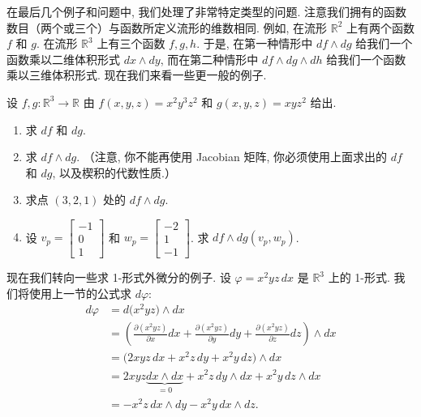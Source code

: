 在最后几个例子和问题中, 我们处理了非常特定类型的问题. 注意我们拥有的函数数目（两个或三个）与函数所定义流形的维数相同. 例如, 在流形 $\mathbb{R}^2$ 上有两个函数 $f$ 和 $g$. 在流形 $\mathbb{R}^3$ 上有三个函数 $f,g,h$. 于是, 在第一种情形中 $df\wedge dg$ 给我们一个函数乘以二维体积形式 $dx\wedge dy$, 而在第二种情形中 $df\wedge dg\wedge dh$ 给我们一个函数乘以三维体积形式. 现在我们来看一些更一般的例子.

\begin{question}\label{q:4-13}
设 $f,g:\mathbb{R}^3\to\mathbb{R}$ 由 $f(x,y,z)=x^2y^3z^2$ 和 $g(x,y,z)=xyz^2$ 给出.
\begin{enumerate}
  \item[(a)] 求 $df$ 和 $dg$.
  \item[(b)] 求 $df\wedge dg$. （注意, 你不能再使用 Jacobian 矩阵, 你必须使用上面求出的 $df$ 和 $dg$, 以及楔积的代数性质.）
  \item[(c)] 求点 $(3,2,1)$ 处的 $df\wedge dg$.
  \item[(d)] 设 $v_p=\begin{bmatrix}-1\\0\\1\end{bmatrix}$ 和 $w_p=\begin{bmatrix}-2\\1\\-1\end{bmatrix}$. 求 $df\wedge dg(v_p,w_p)$.
\end{enumerate}
\end{question}

现在我们转向一些求 1-形式外微分的例子. 设 $\varphi=x^2yz\,dx$ 是 $\mathbb{R}^3$ 上的 1-形式. 我们将使用上一节的公式求 $d\varphi$: 
\begin{align*}
d\varphi&=d\bigl(x^2yz\bigr)\wedge dx\\
&=\left(\frac{\partial(x^2yz)}{\partial x}dx+\frac{\partial(x^2yz)}{\partial y}dy+\frac{\partial(x^2yz)}{\partial z}dz\right)\wedge dx\\
&=\bigl(2xyz\,dx+x^2z\,dy+x^2y\,dz\bigr)\wedge dx\\
&=2xyz\underbrace{dx\wedge dx}_{=0}+x^2z\,dy\wedge dx+x^2y\,dz\wedge dx\\
&=-x^2z\,dx\wedge dy-x^2y\,dx\wedge dz.
\end{align*}

